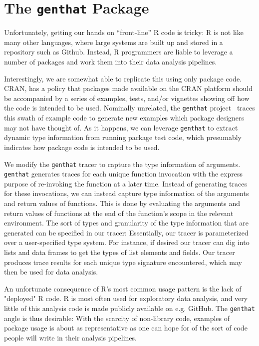 \documentclass[acmsmall,10pt,review,anonymous]{acmart}\settopmatter{printfolios=true,printccs=false,printacmref=false}
\begin{document}
%
%
%
%
\section{The \texttt{genthat} Package}

Unfortunately, getting our hands on ``front-line'' R code is tricky: R is
not like many other languages, where large systems are built up and stored
in a repository such as Github.  Instead, R programmers are liable to
leverage a number of packages and work them into their data analysis
pipelines.

Interestingly, we are somewhat able to replicate this using only package
code.  CRAN, has a policy that packages made available on the CRAN platform
should be accompanied by a series of examples, tests, and/or vignettes
showing off how the code is intended to be used.  Nominally unrelated, the
{\tt genthat} project~\cite{issta18} traces this swath of example code to
generate new examples which package designers may not have thought of.  As
it happens, we can leverage {\tt genthat} to extract dynamic type
information from running package test code, which presumably indicates how
package code is intended to be used.


We modify the {\tt genthat} tracer to capture the type information of
arguments.  {\tt genthat} generates traces for each unique function
invocation with the express purpose of re-invoking the function at a later
time.  Instead of generating traces for these invocations, we can instead
capture type information of the arguments and return values of functions.
This is done by evaluating the arguments and return values of functions at
the end of the function's scope in the relevant environment.  The sort of
types and granularity of the type information that are generated can be
specified in our tracer: Essentially, our tracer is parameterized over a
user-specified type system.  For instance, if desired our tracer can dig
into lists and data frames to get the types of list elements and fields.
Our tracer produces trace results for each unique type signature
encountered, which may then be used for data analysis.

An unfortunate consequence of R's most common usage pattern is the lack of
"deployed" R code.  R is most often used for exploratory data analysis, and
very little of this analysis code is made publicly available on e.g. GitHub.
The {\tt genthat} angle is thus desirable: With the scarcity of non-library
code, examples of package usage is about as representative as one can hope
for of the sort of code people will write in their analysis pipelines.
\end{document}
